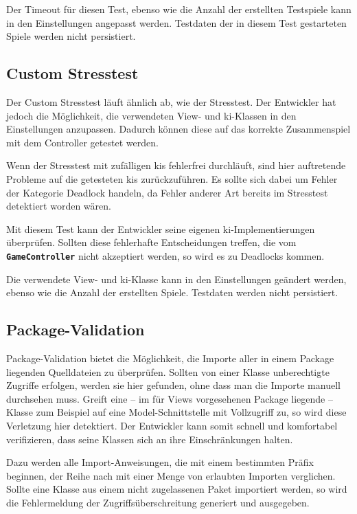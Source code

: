 \documentclass[
							a4paper, 
							11pt, 
							openany, 
							liststotoc,
							parskip=half, 
   							headings=normal
						]{scrreprt}
\begin{document}
{Der Timeout für diesen Test, ebenso wie die Anzahl der erstellten Testspiele kann in den Einstellungen angepasst werden. Testdaten der in diesem Test gestarteten Spiele werden nicht persistiert.

\subsection{Custom Stresstest} \label{sse:testing_tests_stress_custom}
Der Custom Stresstest läuft ähnlich ab, wie der Stresstest. Der Entwickler hat jedoch die Möglichkeit, die verwendeten View- und \acs{ki}-Klassen in den Einstellungen anzupassen. Dadurch können diese auf das korrekte Zusammenspiel mit dem Controller getestet werden.

Wenn der Stresstest mit zufälligen \acs{ki}s fehlerfrei durchläuft, sind hier auftretende Probleme auf die getesteten \acs{ki}s zurückzuführen. Es sollte sich dabei um Fehler der Kategorie Deadlock handeln, da Fehler anderer Art bereits im Stresstest detektiert worden wären.

Mit diesem Test kann der Entwickler seine eigenen \acs{ki}-Implementierungen überprüfen. Sollten diese fehlerhafte Entscheidungen treffen, die vom \textbf{\texttt{GameController}} nicht akzeptiert werden, so wird es zu Deadlocks kommen. 

Die verwendete View- und \acs{ki}-Klasse kann in den Einstellungen geändert werden, ebenso wie die Anzahl der erstellten Spiele. Testdaten werden nicht persistiert.

\subsection{Package-Validation} \label{sse:testing_tests_package_validation}
Package-Validation bietet die Möglichkeit, die Importe aller in einem Package liegenden Quelldateien zu überprüfen. Sollten von einer Klasse unberechtigte Zugriffe erfolgen, werden sie hier gefunden, ohne dass man die Importe manuell durchsehen muss. Greift eine -- im für Views vorgesehenen Package liegende -- Klasse zum Beispiel auf eine Model-Schnittstelle mit Vollzugriff zu, so wird diese Verletzung hier detektiert.\newline
Der Entwickler kann somit schnell und komfortabel verifizieren, dass seine Klassen sich an ihre Einschränkungen halten.

Dazu werden alle Import-Anweisungen, die mit einem bestimmten Präfix beginnen, der Reihe nach mit einer Menge von erlaubten Importen verglichen. Sollte eine Klasse aus einem nicht zugelassenen Paket importiert werden, so wird die Fehlermeldung der Zugriffsüberschreitung generiert und ausgegeben.

}
\end{document}
